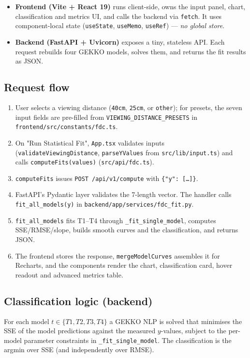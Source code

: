 \documentclass[11pt,a4paper]{article}
\begin{document}
\begin{itemize}[leftmargin=1.2em]
  \item \textbf{Frontend (Vite + React 19)} runs client-side, owns the input
        panel, chart, classification and metrics UI, and calls the backend via
        \texttt{fetch}. It uses component-local state (\texttt{useState},
        \texttt{useMemo}, \texttt{useRef}) --- \emph{no global store}.
  \item \textbf{Backend (FastAPI + Uvicorn)} exposes a tiny, stateless API.
        Each request rebuilds four GEKKO models, solves them, and returns the
        fit results as JSON.
\end{itemize}

\subsection{Request flow}
\begin{enumerate}[leftmargin=1.6em]
  \item User selects a viewing distance (\texttt{40cm}, \texttt{25cm}, or
        \texttt{other}); for presets, the seven input fields are pre-filled
        from \texttt{VIEWING\_DISTANCE\_PRESETS} in
        \texttt{frontend/src/constants/fdc.ts}.
  \item On "Run Statistical Fit", \texttt{App.tsx} validates inputs
        (\texttt{validateViewingDistance}, \texttt{parseYValues} from
        \texttt{src/lib/input.ts}) and calls \texttt{computeFits(values)}
        (\texttt{src/api/fdc.ts}).
  \item \texttt{computeFits} issues \texttt{POST /api/v1/compute} with
        \texttt{\{"y": [\ldots]\}}.
  \item FastAPI's Pydantic layer validates the 7-length vector. The handler
        calls \texttt{fit\_all\_models(y)} in
        \texttt{backend/app/services/fdc\_fit.py}.
  \item \texttt{fit\_all\_models} fits T1--T4 through
        \texttt{\_fit\_single\_model}, computes SSE/RMSE/slope, builds smooth
        curves and the classification, and returns JSON.
  \item The frontend stores the response, \texttt{mergeModelCurves} assembles
        it for Recharts, and the components render the chart, classification
        card, hover readout and advanced metrics table.
\end{enumerate}

\subsection{Classification logic (backend)}
For each model $t \in \{T1,T2,T3,T4\}$ a GEKKO NLP is solved that minimises
the SSE of the model predictions against the measured $y$-values, subject to
the per-model parameter constraints in \texttt{\_fit\_single\_model}. The
classification is the argmin over SSE (and independently over RMSE).
\end{document}
